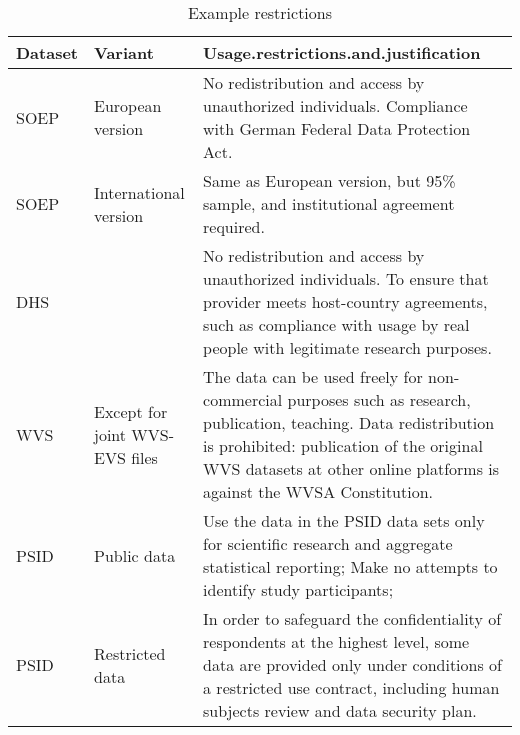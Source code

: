 \begin{table}[h]
\centering
\caption{Example restrictions} 
\label{tab:restrictions}
\begin{tabular}{llp{4in}}
  \toprule
Dataset & Variant & Usage.restrictions.and.justification \\ 
  \midrule
SOEP & European version & No redistribution and access by unauthorized individuals. Compliance with  German Federal Data Protection Act. \\ 
  SOEP & International version & Same as European version, but 95\% sample, and institutional agreement required. \\ 
  DHS &  & No redistribution and access by unauthorized individuals. To ensure that provider meets host-country agreements, such as compliance with usage by  real people with legitimate research purposes. \\ 
  WVS & Except for joint WVS-EVS files & The data can be used freely for non-commercial purposes such as research, publication, teaching. Data redistribution is prohibited: publication of the original WVS datasets at other online platforms is against the WVSA Constitution. \\ 
  PSID & Public data & Use the data in the PSID data sets only for scientific research and aggregate statistical reporting; Make no attempts to identify study participants; \\ 
  PSID & Restricted data & In order to safeguard the confidentiality of respondents at the highest level, some data are provided only under conditions of a restricted use contract, including human subjects review and data security plan. \\ 
   \bottomrule
\end{tabular}
\end{table}
